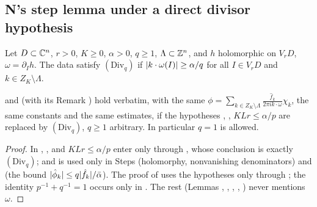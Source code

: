 \subsection{N's step lemma under a direct divisor hypothesis}\label{bpP:p2:s-direct}

\begin{definition}\label{bpP:p2:setting}
Let $D\subset\mathbb{C}^n$, $r>0$, $K\ge0$, $\alpha>0$, $q\ge1$, $\Lambda\subset\mathbb{Z}^n$, and $h$ holomorphic on $V_rD$, $\omega=\partial_Ih$. The data satisfy $(\mathrm{Div}_q)$ if
$\lvert k\cdot\omega(I)\rvert\ge\alpha/q$ for all $I\in V_rD$ and $k\in Z_K\setminus\Lambda$.
\end{definition}

\begin{lemma}\label{bpP:p2:direct}
 and  (with its Remark ) hold verbatim, with the same $\phi=\sum_{k\in Z_K\setminus\Lambda}\frac{\hat f_k}{2\pi ik\cdot\omega}\chi_k$, the same constants and the same estimates, if the hypotheses
, , $KLr\le\alpha/p$ are replaced by $(\mathrm{Div}_q)$, $q\ge1$ arbitrary. In particular $q=1$ is allowed.
\end{lemma}
\begin{proof}
\label{stepP:p2:dr-use} In , ,  and $KLr\le\alpha/p$ enter only through , whose
conclusion is exactly $(\mathrm{Div}_q)$; and  is used only in Steps  (holomorphy, nonvanishing denominators) and  (the bound $\lvert \hat\phi_k\rvert\le q\lvert \hat f_k\rvert/\bar\alpha$).
The proof of  uses the hypotheses only through ; the identity $p^{-1}+q^{-1}=1$ occurs only in . The rest (Lemmas , , , , ) never mentions $\omega$.
\end{proof}

